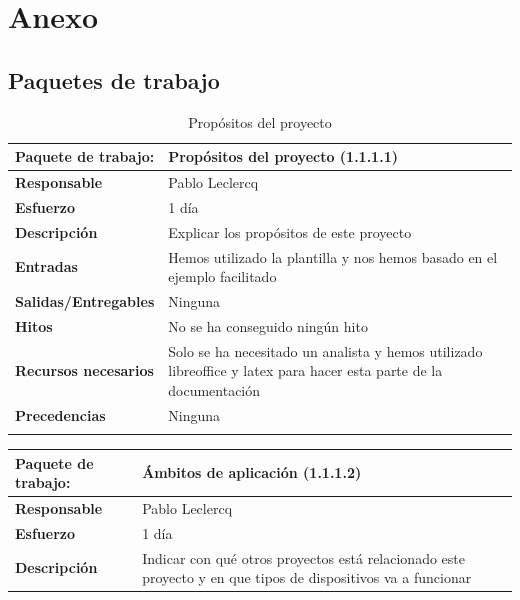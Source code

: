 \documentclass{report}
\begin{document}
    \chapter{Anexo} %
        \section{Paquetes de trabajo}
            \begin{center}
                \begin{longtable}{|p{6cm}|p{6cm}|}
                    \hline
                    \textbf{Paquete de trabajo:} & Propósitos del proyecto (1.1.1.1)\\
                    \hline
                    \textbf{Responsable} & Pablo Leclercq\\
                    \hline
                    \textbf{Esfuerzo} & 1 día\\
                    \hline
                    \textbf{Descripción} & Explicar los propósitos de este proyecto\\
                    \hline
                    \textbf{Entradas} & Hemos utilizado la plantilla y nos hemos basado en el ejemplo facilitado\\
                    \hline
                    \textbf{Salidas/Entregables} & Ninguna\\
                    \hline
                    \textbf{Hitos} & No se ha conseguido ningún hito\\
                    \hline
                    \textbf{Recursos necesarios} & Solo se ha necesitado un analista y hemos utilizado libreoffice y latex para hacer esta parte de la documentación\\
                    \hline
                    \textbf{Precedencias} & Ninguna\\
                    \hline
                    \caption{Propósitos del proyecto}
                \end{longtable}
                \begin{longtable}{|p{6cm}|p{6cm}|}
                    \hline
                    \textbf{Paquete de trabajo:} & Ámbitos de aplicación (1.1.1.2)\\
                    \hline
                    \textbf{Responsable} & Pablo Leclercq\\
                    \hline
                    \textbf{Esfuerzo} & 1 día\\
                    \hline
                    \textbf{Descripción} & Indicar con qué otros proyectos está relacionado este proyecto y en que tipos de dispositivos va a funcionar\\

\end{longtable}
\end{center}
\end{document}
